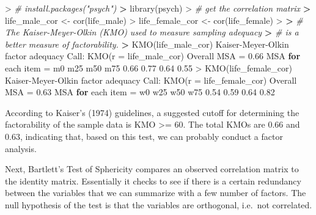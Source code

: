 \documentclass[
]{article}
\newenvironment{Shaded}{\begin{snugshade}}{\end{snugshade}}
\newcommand{\AttributeTok}[1]{\textcolor[rgb]{0.77,0.63,0.00}{#1}}
\newcommand{\CommentTok}[1]{\textcolor[rgb]{0.56,0.35,0.01}{\textit{#1}}}
\newcommand{\ControlFlowTok}[1]{\textcolor[rgb]{0.13,0.29,0.53}{\textbf{#1}}}
\newcommand{\ErrorTok}[1]{\textcolor[rgb]{0.64,0.00,0.00}{\textbf{#1}}}
\newcommand{\FloatTok}[1]{\textcolor[rgb]{0.00,0.00,0.81}{#1}}
\newcommand{\FunctionTok}[1]{\textcolor[rgb]{0.00,0.00,0.00}{#1}}
\newcommand{\NormalTok}[1]{#1}
\newcommand{\OtherTok}[1]{\textcolor[rgb]{0.56,0.35,0.01}{#1}}
\newcommand{\SpecialCharTok}[1]{\textcolor[rgb]{0.00,0.00,0.00}{#1}}
\begin{document}
\begin{Shaded}
\begin{Highlighting}[]
\SpecialCharTok{\textgreater{}} \CommentTok{\# install.packages("psych")}
\ErrorTok{\textgreater{}} \FunctionTok{library}\NormalTok{(psych)}
\SpecialCharTok{\textgreater{}} \CommentTok{\# get the correlation matrix}
\ErrorTok{\textgreater{}}\NormalTok{ life\_male\_cor }\OtherTok{\textless{}{-}} \FunctionTok{cor}\NormalTok{(life\_male)}
\SpecialCharTok{\textgreater{}}\NormalTok{ life\_female\_cor }\OtherTok{\textless{}{-}} \FunctionTok{cor}\NormalTok{(life\_female)}
\SpecialCharTok{\textgreater{}} 
\ErrorTok{\textgreater{}} \CommentTok{\# The Kaiser{-}Meyer{-}Olkin (KMO) used to measure sampling adequacy }
\ErrorTok{\textgreater{}} \CommentTok{\# is a better measure of factorability.}
\ErrorTok{\textgreater{}} \FunctionTok{KMO}\NormalTok{(life\_male\_cor)}
\NormalTok{Kaiser}\SpecialCharTok{{-}}\NormalTok{Meyer}\SpecialCharTok{{-}}\NormalTok{Olkin factor adequacy}
\NormalTok{Call}\SpecialCharTok{:} \FunctionTok{KMO}\NormalTok{(}\AttributeTok{r =}\NormalTok{ life\_male\_cor)}
\NormalTok{Overall MSA }\OtherTok{=}  \FloatTok{0.66}
\NormalTok{MSA }\ControlFlowTok{for}\NormalTok{ each item }\OtherTok{=} 
\NormalTok{  m0  m25  m50  m75 }
\FloatTok{0.66} \FloatTok{0.77} \FloatTok{0.64} \FloatTok{0.55} 
\SpecialCharTok{\textgreater{}} \FunctionTok{KMO}\NormalTok{(life\_female\_cor)}
\NormalTok{Kaiser}\SpecialCharTok{{-}}\NormalTok{Meyer}\SpecialCharTok{{-}}\NormalTok{Olkin factor adequacy}
\NormalTok{Call}\SpecialCharTok{:} \FunctionTok{KMO}\NormalTok{(}\AttributeTok{r =}\NormalTok{ life\_female\_cor)}
\NormalTok{Overall MSA }\OtherTok{=}  \FloatTok{0.63}
\NormalTok{MSA }\ControlFlowTok{for}\NormalTok{ each item }\OtherTok{=} 
\NormalTok{  w0  w25  w50  w75 }
\FloatTok{0.54} \FloatTok{0.59} \FloatTok{0.64} \FloatTok{0.82} 
\end{Highlighting}
\end{Shaded}

According to Kaiser's (1974) guidelines, a suggested cutoff for
determining the factorability of the sample data is KMO \textgreater=
60. The total KMOs are 0.66 and 0.63, indicating that, based on this
test, we can probably conduct a factor analysis.

Next, Bartlett's Test of Sphericity compares an observed correlation
matrix to the identity matrix. Essentially it checks to see if there is
a certain redundancy between the variables that we can summarize with a
few number of factors. The null hypothesis of the test is that the
variables are orthogonal, i.e.~not correlated.
\end{document}
